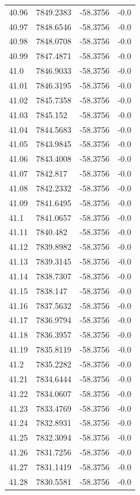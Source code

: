 \begin{table}[H]
\begin{tabular}{llll}
40.96 & 7849.2383 & -58.3756 & -0.0 \\
40.97 & 7848.6546 & -58.3756 & -0.0 \\
40.98 & 7848.0708 & -58.3756 & -0.0 \\
40.99 & 7847.4871 & -58.3756 & -0.0 \\
41.0 & 7846.9033 & -58.3756 & -0.0 \\
41.01 & 7846.3195 & -58.3756 & -0.0 \\
41.02 & 7845.7358 & -58.3756 & -0.0 \\
41.03 & 7845.152 & -58.3756 & -0.0 \\
41.04 & 7844.5683 & -58.3756 & -0.0 \\
41.05 & 7843.9845 & -58.3756 & -0.0 \\
41.06 & 7843.4008 & -58.3756 & -0.0 \\
41.07 & 7842.817 & -58.3756 & -0.0 \\
41.08 & 7842.2332 & -58.3756 & -0.0 \\
41.09 & 7841.6495 & -58.3756 & -0.0 \\
41.1 & 7841.0657 & -58.3756 & -0.0 \\
41.11 & 7840.482 & -58.3756 & -0.0 \\
41.12 & 7839.8982 & -58.3756 & -0.0 \\
41.13 & 7839.3145 & -58.3756 & -0.0 \\
41.14 & 7838.7307 & -58.3756 & -0.0 \\
41.15 & 7838.147 & -58.3756 & -0.0 \\
41.16 & 7837.5632 & -58.3756 & -0.0 \\
41.17 & 7836.9794 & -58.3756 & -0.0 \\
41.18 & 7836.3957 & -58.3756 & -0.0 \\
41.19 & 7835.8119 & -58.3756 & -0.0 \\
41.2 & 7835.2282 & -58.3756 & -0.0 \\
41.21 & 7834.6444 & -58.3756 & -0.0 \\
41.22 & 7834.0607 & -58.3756 & -0.0 \\
41.23 & 7833.4769 & -58.3756 & -0.0 \\
41.24 & 7832.8931 & -58.3756 & -0.0 \\
41.25 & 7832.3094 & -58.3756 & -0.0 \\
41.26 & 7831.7256 & -58.3756 & -0.0 \\
41.27 & 7831.1419 & -58.3756 & -0.0 \\
41.28 & 7830.5581 & -58.3756 & -0.0 \\

\end{tabular}
\end{table}

